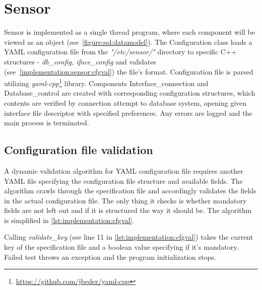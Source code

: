 \documentclass[12pt,a4paper,twoside]{report}
\begin{document}
	\section{Sensor} \label{implementation:sensor}
		Sensor is implemented as a single thread program, where each component will be viewed as an object (see~\autoref{figure:sol:datamodel}). The Configuration class loads a YAML configuration file from the \emph{"/etc/sensor/"} directory to specific C++ structures - \emph{db\_config, iface\_config} and validates (see~\autoref{implementation:sensor:cfgval}) the file's format. Configuration file is parsed utilizing \emph{yaml-cpp}\footnote{\url{https://github.com/jbeder/yaml-cpp}} library. Components Interface\_connection and Database\_control are created with corresponding configuration structures, which contents are verified by connection attempt to database system, opening given interface file descriptor with specified preferences. Any errors are logged and the main process is terminated.
		\subsection{Configuration file validation} \label{implementation:sensor:cfgval}
			A dynamic validation algorithm for YAML configuration file requires another YAML file specifying the configuration file structure and available fields. The algorithm crawls through the specification file and accordingly validates the fields in the actual configuration file. The only thing it checks is whether mandatory fields are not left out and if it is structured the way it should be. The algorithm is simplified in \autoref{lst:implementation:cfgval}.
			
			Calling \emph{validate\_key} (see line 11 in \autoref{lst:implementation:cfgval}) takes the current key of the specification file and a boolean value specifying if it's mandatory. Failed test throws an exception and the program initialization stops. 
\end{document}
